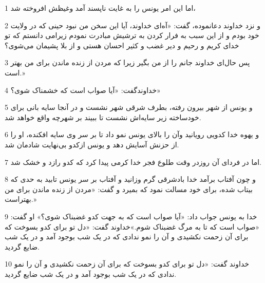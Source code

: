 \par 1 اما این امر یونس را به غایت ناپسند آمد وغیظش افروخته شد،
\par 2 و نزد خداوند دعانموده، گفت: «آه‌ای خداوند، آیا این سخن من نبود حینی که در ولایت خود بودم و از این سبب به فرار کردن به ترشیش مبادرت نمودم زیرامی دانستم که تو خدای کریم و رحیم و دیر غضب و کثیر احسان هستی و از بلا پشیمان می‌شوی؟
\par 3 پس حال‌ای خداوند جانم را از من بگیر زیرا که مردن از زنده ماندن برای من بهتر است.»
\par 4 خداوندگفت: «آیا صواب است که خشمناک شوی؟»
\par 5 و یونس از شهر بیرون رفته، بطرف شرقی شهر نشست و در آنجا سایه بانی برای خودساخته زیر سایه‌اش نشست تا ببیند بر شهر‌چه واقع خواهد شد.
\par 6 و یهوه خدا کدویی رویانید وآن را بالای یونس نمو داد تا بر سر وی سایه افکنده، او را از حزنش آسایش دهد و یونس ازکدو بی‌نهایت شادمان شد.
\par 7 اما در فردای آن روزدر وقت طلوع فجر خدا کرمی پیدا کرد که کدو رازد و خشک شد.
\par 8 و چون آفتاب برآمد خدا بادشرقی گرم وزانید و آفتاب بر سر یونس تابید به حدی که بیتاب شده، برای خود مسالت نمود که بمیرد و گفت: «مردن از زنده ماندن برای من بهتراست.»
\par 9 خدا به یونس جواب داد: «آیا صواب است که به جهت کدو غضبناک شوی؟» او گفت: «صواب است که تا به مرگ غضبناک شوم.»خداوند گفت: «دل تو برای کدو بسوخت که برای آن زحمت نکشیدی و آن را نمو ندادی که در یک شب بوجود آمد و در یک شب ضایع گردید.
\par 10 خداوند گفت: «دل تو برای کدو بسوخت که برای آن زحمت نکشیدی و آن را نمو ندادی که در یک شب بوجود آمد و در یک شب ضایع گردید.



